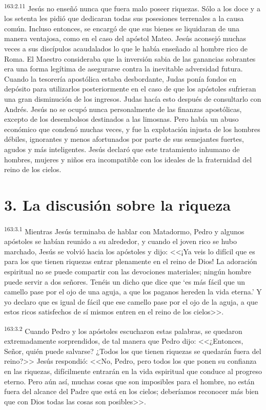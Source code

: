 \par 
\textsuperscript{163:2.11} Jesús no enseñó nunca que fuera malo poseer riquezas. Sólo a los doce y a los setenta les pidió que dedicaran todas sus posesiones terrenales a la causa común. Incluso entonces, se encargó de que sus bienes se liquidaran de una manera ventajosa, como en el caso del apóstol Mateo. Jesús aconsejó muchas veces a sus discípulos acaudalados lo que le había enseñado al hombre rico de Roma. El Maestro consideraba que la inversión sabia de las ganancias sobrantes era una forma legítima de asegurarse contra la inevitable adversidad futura. Cuando la tesorería apostólica estaba desbordante, Judas ponía fondos en depósito para utilizarlos posteriormente en el caso de que los apóstoles sufrieran una gran disminución de los ingresos. Judas hacía esto después de consultarlo con Andrés. Jesús no se ocupó nunca personalmente de las finanzas apostólicas, excepto de los desembolsos destinados a las limosnas. Pero había un abuso económico que condenó muchas veces, y fue la explotación injusta de los hombres débiles, ignorantes y menos afortunados por parte de sus semejantes fuertes, agudos y más inteligentes. Jesús declaró que este tratamiento inhumano de hombres, mujeres y niños era incompatible con los ideales de la fraternidad del reino de los cielos.

\section*{3. La discusión sobre la riqueza}
\par 
\textsuperscript{163:3.1} Mientras Jesús terminaba de hablar con Matadormo, Pedro y algunos apóstoles se habían reunido a su alrededor, y cuando el joven rico se hubo marchado, Jesús se volvió hacia los apóstoles y dijo: <<¡Ya veis lo difícil que es para los que tienen riquezas entrar plenamente en el reino de Dios! La adoración espiritual no se puede compartir con las devociones materiales; ningún hombre puede servir a dos señores. Tenéis un dicho que dice que `es más fácil que un camello pase por el ojo de una aguja, a que los paganos hereden la vida eterna.' Y yo declaro que es igual de fácil que ese camello pase por el ojo de la aguja, a que estos ricos satisfechos de sí mismos entren en el reino de los cielos>>.

\par 
\textsuperscript{163:3.2} Cuando Pedro y los apóstoles escucharon estas palabras, se quedaron extremadamente sorprendidos, de tal manera que Pedro dijo: <<¿Entonces, Señor, quién puede salvarse? ¿Todos los que tienen riquezas se quedarán fuera del reino?>> Jesús respondió: <<No, Pedro, pero todos los que ponen su confianza en las riquezas, difícilmente entrarán en la vida espiritual que conduce al progreso eterno. Pero aún así, muchas cosas que son imposibles para el hombre, no están fuera del alcance del Padre que está en los cielos; deberíamos reconocer más bien que con Dios todas las cosas son posibles>>.

